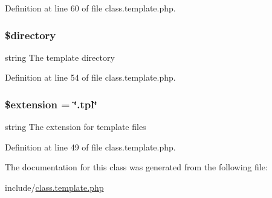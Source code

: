Definition at line 60 of file class.\-template.\-php.

\hypertarget{class_template_a1b07c630eb02f770a082a013373a16d6}{
\subsubsection[{\$directory}]{\setlength{\rightskip}{0pt plus 5cm}\$directory}}\label{class_template_a1b07c630eb02f770a082a013373a16d6}
string The template directory 

Definition at line 54 of file class.\-template.\-php.

\hypertarget{class_template_aed02cd2cd0ee08bd99a2ac1ef4f955ce}{
\subsubsection[{\$extension}]{\setlength{\rightskip}{0pt plus 5cm}\$extension = \char`\"{}.tpl\char`\"{}}}\label{class_template_aed02cd2cd0ee08bd99a2ac1ef4f955ce}
string The extension for template files 

Definition at line 49 of file class.\-template.\-php.



The documentation for this class was generated from the following file\-:\begin{DoxyCompactItemize}
\item 
include/\hyperlink{class_8template_8php}{class.\-template.\-php}\end{DoxyCompactItemize}
